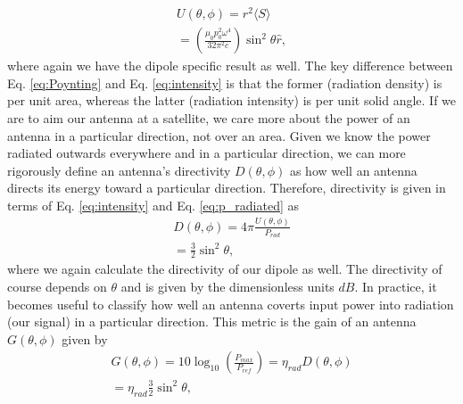 \documentclass[10pt]{article}
\begin{document}
\begin{align}
U(\theta,\phi) = r^2\langle S\rangle \\
= (\frac{\mu_0p_0^2\omega^4}{32 \pi^2 c})\sin^2\theta\hat{r},
    \label{eq:intensity}
\end{align}
where again we have the dipole specific result as well. The key difference between Eq. \ref{eq:Poynting} and Eq. \ref{eq:intensity} is that the former (radiation density) is per unit area, whereas the latter (radiation intensity) is per unit solid angle. If we are to aim our antenna at a satellite, we care more about the power of an antenna in a particular direction, not over an area. Given we know the power radiated outwards everywhere and in a particular direction, we can more rigorously define an antenna's directivity $D(\theta,\phi)$ as how well an antenna directs its energy toward a particular direction. Therefore, directivity is given in terms of Eq. \ref{eq:intensity} and Eq. \ref{eq:p_radiated} as
\begin{align} 
D(\theta,\phi) = 4\pi \frac{U(\theta,\phi)}{P_{rad}} \\
= \frac{3}{2}\sin^2\theta,
    \label{eq:directivity}
\end{align}
where we again calculate the directivity of our dipole as well. The directivity of course depends on $\theta$ and is given by the dimensionless units $\si{dB}$. In practice, it becomes useful to classify how well an antenna coverts input power into radiation (our signal) in a particular direction. This metric is the gain of an antenna $G(\theta,\phi)$ given by
\begin{align}
G(\theta,\phi) = 10\log_{10}(\frac{P_{max}}{P_{ref}}) = \eta_{rad}D(\theta,\phi) \\
= \eta_{rad}\frac{3}{2}\sin^2\theta,
    \label{eq:gain}
\end{align}
\end{document}
